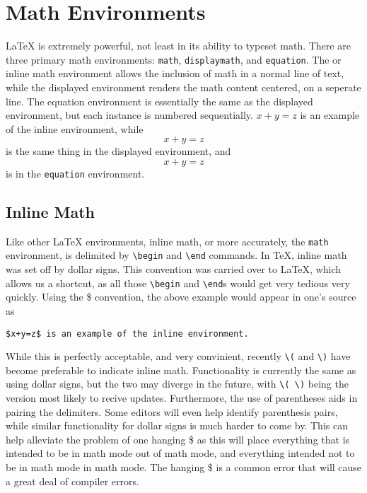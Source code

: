 \section{Math Environments}
\label{sec:math-environments}

\LaTeX{} is extremely powerful, not least in its ability to typeset
math.  There are three primary math environments: \texttt{math},
\texttt{displaymath}, and \texttt{equation}.  The  or
inline math environment
allows the inclusion of math in a normal line of text, while the
displayed environment renders the math content centered, on a
seperate line.  The
equation environment is essentially the same as the displayed
environment, but each instance is numbered sequentially.  \(x+y=z\) is
an example of the inline environment, while \[x+y=z\] is the same
thing in the displayed environment, and
\begin{equation}
x+y=z
\end{equation}
is in the \texttt{equation} environment.

\subsection{Inline Math}
\label{sec:inline-math}

Like other \LaTeX{} environments, inline math, or more accurately, the
\texttt{math} environment, is delimited by \verb=\begin= and
\verb=\end= commands.  In \TeX{}, inline math was set off by dollar
signs.  This convention was carried over to \LaTeX{}, which allows us
a shortcut, as all those \verb=\begin= and \verb=\end=s would get very
tedious very quickly.  Using the \$ convention, the above example
would appear in one's source as
\begin{verbatim}
$x+y=z$ is an example of the inline environment.
\end{verbatim}
While this is perfectly acceptable, and very convinient, recently
\verb=\(= and \verb=\)= have become preferable to indicate inline
math. Functionality is currently the same as using dollar signs,
but the two may diverge in the future, with \verb=\( \)= being
the version most likely to recive updates. Furthermore, the use
of parentheses aids in pairing the delimiters. Some editors will
even help identify parenthesis pairs, while similar functionality
for dollar signs is much harder to come by. This can help alleviate
the problem of one hanging \$ as this will place everything that
is intended to be in math mode out of math mode, and everything
intended not to be in math mode in math mode. The hanging \$
is a common error that will cause a great deal of compiler
errors.

